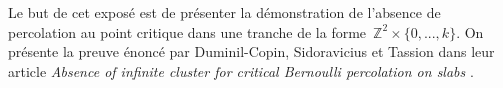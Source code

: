 Le but de cet exposé est de présenter la démonstration de l'absence de percolation au point critique dans une tranche de la forme~$\mathbb{Z}^2\times\{0,...,k\}$. On présente la preuve énoncé par Duminil-Copin, Sidoravicius et Tassion dans leur article \emph{Absence of infinite cluster for critical Bernoulli percolation on slabs} \cite{main}.